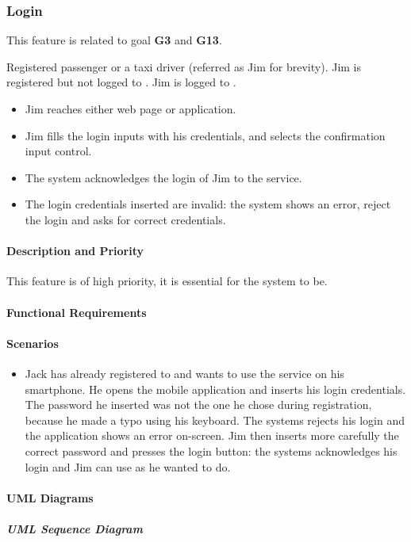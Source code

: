 \subsubsection{Login}
This feature is related to goal \textbf{G3} and \textbf{G13}.
\begin{itemize}
	 Registered passenger or a taxi driver (referred as Jim for brevity).
	 Jim is registered but not logged to \myTaxiService{}.
	 Jim is logged to \myTaxiService{}.
	\begin{itemize}
		\item Jim reaches either \myTaxiService{} web page or application.
		\item Jim fills the login inputs with his credentials, and selects the confirmation input control.
		\item The system acknowledges the login of Jim to the service.
	\end{itemize}
	\begin{itemize}
		\item The login credentials inserted are invalid: the system shows an error, reject the login and asks for correct credentials.
	\end{itemize}
\end{itemize}
\paragraph{Description and Priority}
This feature is of high priority, it is essential for the system to be.\par
\paragraph{Functional Requirements}
\begin{itemize}
\end{itemize}
\paragraph{Scenarios}
\begin{itemize}
	\item Jack has already registered to \myTaxiService{} and wants to use the service on his smartphone.
	He opens the mobile application and inserts his login credentials.
	The password he inserted was not the one he chose during registration, because he made a typo using his keyboard.
	The systems rejects his login and the application shows an error on-screen.
	Jim then inserts more carefully the correct password and presses the login button: the systems acknowledges his login and Jim can use \myTaxiService{} as he wanted to do.
\end{itemize}
\paragraph{UML Diagrams}
\subparagraph{UML Sequence Diagram}
